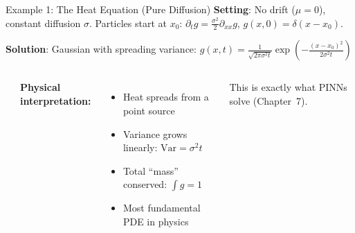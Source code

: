 \documentclass[aspectratio=169,11pt]{beamer}
\newcommand{\emphc}[1]{\textcolor{harvardcrimson}{#1}}
\begin{document}
\begin{frame}{Example 1: The Heat Equation (Pure Diffusion)}
\small
\textbf{Setting}: No drift ($\mu = 0$), constant diffusion $\sigma$. Particles start at $x_0$:
$\partial_t g = \frac{\sigma^2}{2}\partial_{xx}g$, \; $g(x,0) = \delta(x - x_0)$.

\textbf{Solution}: Gaussian with spreading variance:
$g(x,t) = \frac{1}{\sqrt{2\pi\sigma^2 t}}\exp\!\left(-\frac{(x-x_0)^2}{2\sigma^2 t}\right)$

\begin{columns}[T]
\begin{center}
\end{center}

\textbf{Physical interpretation:}
\begin{itemize}\itemsep1pt
    \item Heat spreads from a point source
    \item Variance grows linearly: $\text{Var} = \sigma^2 t$
    \item Total ``mass'' conserved: $\int g = 1$
    \item \emphc{Most fundamental PDE in physics}
\end{itemize}

\vspace{0.2em}
{\small This is exactly what PINNs solve (Chapter~7).}
\end{columns}
\end{frame}
\end{document}
